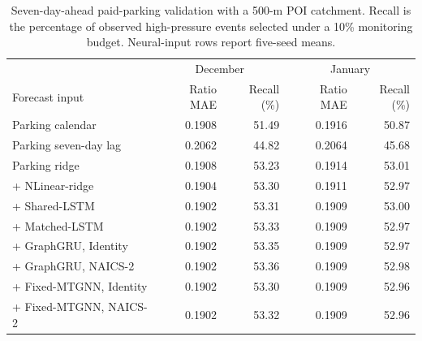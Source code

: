 \begin{table}[!htbp]
\centering\small
\caption{Seven-day-ahead paid-parking validation with a 500-m POI catchment. Recall is the percentage of observed high-pressure events selected under a 10\% monitoring budget. Neural-input rows report five-seed means.}
\label{tab:parking_validation}
\begin{tabular}{lrrrr}
\toprule
 & \multicolumn{2}{c}{December} & \multicolumn{2}{c}{January} \\
Forecast input & Ratio MAE & Recall (\%) & Ratio MAE & Recall (\%) \\
\midrule
Parking calendar & 0.1908 & 51.49 & 0.1916 & 50.87 \\
Parking seven-day lag & 0.2062 & 44.82 & 0.2064 & 45.68 \\
Parking ridge & 0.1908 & 53.23 & 0.1914 & 53.01 \\
+ NLinear-ridge & 0.1904 & 53.30 & 0.1911 & 52.97 \\
+ Shared-LSTM & 0.1902 & 53.31 & 0.1909 & 53.00 \\
+ Matched-LSTM & 0.1902 & 53.33 & 0.1909 & 52.97 \\
+ GraphGRU, Identity & 0.1902 & 53.35 & 0.1909 & 52.97 \\
+ GraphGRU, NAICS-2 & 0.1902 & 53.36 & 0.1909 & 52.98 \\
+ Fixed-MTGNN, Identity & 0.1902 & 53.30 & 0.1909 & 52.96 \\
+ Fixed-MTGNN, NAICS-2 & 0.1902 & 53.32 & 0.1909 & 52.96 \\
\bottomrule
\end{tabular}
\end{table}
